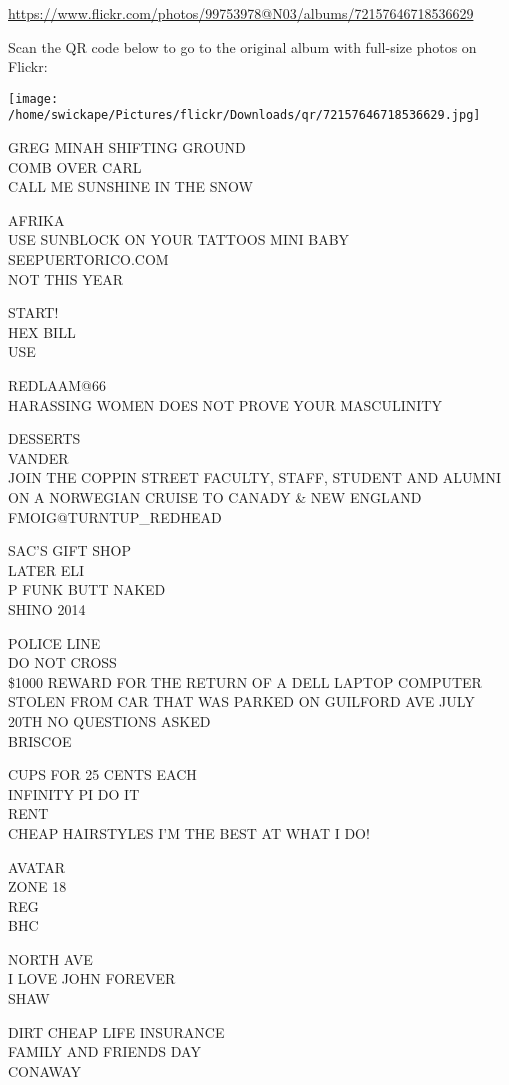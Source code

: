 \documentclass[10pt,letterpaper]{article}
\begin{document}
\url{https://www.flickr.com/photos/99753978@N03/albums/72157646718536629}

Scan the QR code below to go to the original album with full-size photos on Flickr:

\texttt{[image: /home/swickape/Pictures/flickr/Downloads/qr/72157646718536629.jpg]}


GREG MINAH SHIFTING GROUND\\
COMB OVER CARL\\
CALL ME SUNSHINE IN THE SNOW

AFRIKA\\
USE SUNBLOCK ON YOUR TATTOOS MINI BABY\\
SEEPUERTORICO.COM\\
NOT THIS YEAR

START!\\
HEX BILL\\
USE

REDLAAM@66\\
HARASSING WOMEN DOES NOT PROVE YOUR MASCULINITY

DESSERTS\\
VANDER\\
JOIN THE COPPIN STREET FACULTY, STAFF, STUDENT AND ALUMNI ON A NORWEGIAN CRUISE TO CANADY \& NEW ENGLAND\\
FMOIG@TURNTUP\_REDHEAD

SAC'S GIFT SHOP\\
LATER ELI\\
P FUNK BUTT NAKED\\
SHINO 2014

POLICE LINE\\
DO NOT CROSS\\
\$1000 REWARD FOR THE RETURN OF A DELL LAPTOP COMPUTER STOLEN FROM CAR THAT WAS PARKED ON GUILFORD AVE JULY 20TH NO QUESTIONS ASKED\\
BRISCOE

CUPS FOR 25 CENTS EACH\\
INFINITY PI DO IT\\
RENT\\
CHEAP HAIRSTYLES I'M THE BEST AT WHAT I DO!

AVATAR\\
ZONE 18\\
REG\\
BHC

NORTH AVE\\
I LOVE JOHN FOREVER\\
SHAW

DIRT CHEAP LIFE INSURANCE\\
FAMILY AND FRIENDS DAY\\
CONAWAY
\end{document}

